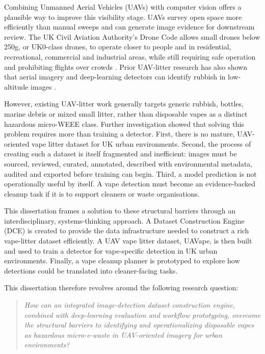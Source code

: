 Combining Unmanned Aerial Vehicles (UAVs) with computer vision offers a plausible way to improve this visibility stage. UAVs survey open space more efficiently than manual sweeps and can generate image evidence for downstream review. The UK Civil Aviation Authority's Drone Code allows small drones below 250g, or UK0-class drones, to operate closer to people and in residential, recreational, commercial and industrial areas, while still requiring safe operation and prohibiting flights over crowds \cite{caa_drone_code_where_fly_2026}. Prior UAV-litter research has also shown that aerial imagery and deep-learning detectors can identify rubbish in low-altitude images \cite{kraft2021uavvaste,bartolo2026litterreview}. 

However, existing UAV-litter work generally targets generic rubbish, bottles, marine debris or mixed small litter, rather than disposable vapes as a distinct hazardous micro-WEEE class. Further investigation showed that solving this problem requires more than training a detector. First, there is no mature, UAV-oriented vape litter dataset for UK urban environments. Second, the process of creating such a dataset is itself fragmented and inefficient: images must be sourced, reviewed, curated, annotated, described with environmental metadata, audited and exported before training can begin. Third, a model prediction is not operationally useful by itself. A vape detection must become an evidence-backed cleanup task if it is to support cleaners or waste organisations.

This dissertation frames a solution to these structural barriers through an interdisciplinary, systems-thinking approach. A Dataset Construction Engine (DCE) is created to provide the data infrastructure needed to construct a rich vape-litter dataset efficiently. A UAV vape litter dataset, UAVape, is then built and used to train a detector for vape-specific detection in UK urban environments. Finally, a vape cleanup planner is prototyped to explore how detections could be translated into cleaner-facing tasks.

This dissertation therefore revolves around the following research question:

\begin{quote}
    \textit{How can an integrated image-detection dataset construction engine, combined with deep-learning evaluation and workflow prototyping, overcome the structural barriers to identifying and operationalizing disposable vapes as hazardous micro-e-waste in UAV-oriented imagery for urban environments?}
\end{quote}

